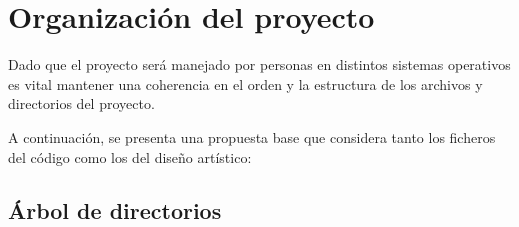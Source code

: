 \section{Organización del proyecto}\label{organizacion:organizacion-del-proyecto}

Dado que el proyecto será manejado por personas en distintos sistemas operativos es vital mantener una coherencia en el orden y la estructura de los archivos y directorios del proyecto.

A continuación, se presenta una propuesta base que considera tanto los ficheros del código como los del diseño artístico:

\subsection{Árbol de directorios}\label{organizacion:arbol-de-directorios}

